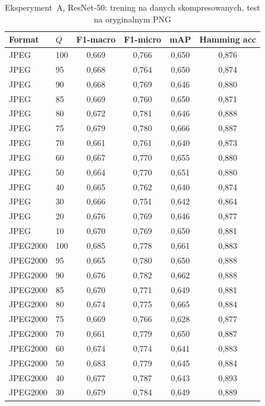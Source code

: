 \documentclass[12pt,a4paper]{article}
\begin{document}
\begin{table}[H]
\centering
\caption{Eksperyment~A, ResNet-50: trening na danych skompresowanych, test na oryginalnym PNG}
\label{tab:exp_a_resnet}
\begin{tabular}{llcccc}
\toprule
Format & $Q$ & F1-macro & F1-micro & mAP & Hamming acc \\
\midrule
JPEG & 100 & 0{,}669 & 0{,}766 & 0{,}650 & 0{,}876 \\
JPEG & 95  & 0{,}668 & 0{,}764 & 0{,}650 & 0{,}874 \\
JPEG & 90  & 0{,}668 & 0{,}769 & 0{,}646 & 0{,}880 \\
JPEG & 85  & 0{,}669 & 0{,}760 & 0{,}650 & 0{,}871 \\
JPEG & 80  & 0{,}672 & 0{,}781 & 0{,}646 & 0{,}888 \\
JPEG & 75  & 0{,}679 & 0{,}780 & 0{,}666 & 0{,}887 \\
JPEG & 70  & 0{,}661 & 0{,}761 & 0{,}640 & 0{,}873 \\
JPEG & 60  & 0{,}667 & 0{,}770 & 0{,}655 & 0{,}880 \\
JPEG & 50  & 0{,}664 & 0{,}770 & 0{,}651 & 0{,}880 \\
JPEG & 40  & 0{,}665 & 0{,}762 & 0{,}640 & 0{,}874 \\
JPEG & 30  & 0{,}666 & 0{,}751 & 0{,}642 & 0{,}864 \\
JPEG & 20  & 0{,}676 & 0{,}769 & 0{,}646 & 0{,}877 \\
JPEG & 10  & 0{,}670 & 0{,}769 & 0{,}650 & 0{,}881 \\
\midrule
JPEG2000 & 100 & 0{,}685 & 0{,}778 & 0{,}661 & 0{,}883 \\
JPEG2000 & 95  & 0{,}665 & 0{,}780 & 0{,}650 & 0{,}888 \\
JPEG2000 & 90  & 0{,}676 & 0{,}782 & 0{,}662 & 0{,}888 \\
JPEG2000 & 85  & 0{,}670 & 0{,}771 & 0{,}649 & 0{,}881 \\
JPEG2000 & 80  & 0{,}674 & 0{,}775 & 0{,}665 & 0{,}884 \\
JPEG2000 & 75  & 0{,}669 & 0{,}766 & 0{,}628 & 0{,}877 \\
JPEG2000 & 70  & 0{,}661 & 0{,}779 & 0{,}650 & 0{,}887 \\
JPEG2000 & 60  & 0{,}674 & 0{,}774 & 0{,}641 & 0{,}883 \\
JPEG2000 & 50  & 0{,}683 & 0{,}779 & 0{,}645 & 0{,}884 \\
JPEG2000 & 40  & 0{,}677 & 0{,}787 & 0{,}643 & 0{,}893 \\
JPEG2000 & 30  & 0{,}679 & 0{,}784 & 0{,}649 & 0{,}889 \\

\end{tabular}
\end{table}
\end{document}
